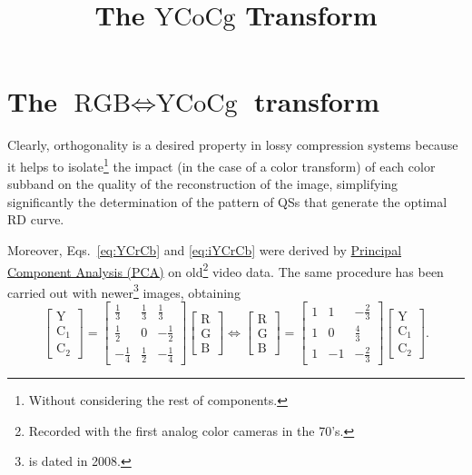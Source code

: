 
\title{The $\text{YCoCg}$ Transform}
\maketitle

\tableofcontents

\section{The $\text{RGB} \Leftrightarrow \text{YCoCg}$ transform}

Clearly, orthogonality is a desired property in lossy compression
systems because it helps to isolate\footnote{Without considering the
rest of components.} the impact (in the case of a color transform) of
each color subband on the quality of the reconstruction of the image,
simplifying significantly the determination of the pattern of QSs that
generate the optimal RD curve.

Moreover, Eqs.~\ref{eq:YCrCb} and \ref{eq:iYCrCb} were derived by
\href{https://en.wikipedia.org/wiki/Principal_component_analysis}{Principal
  Component Analysis (PCA)} on old\footnote{Recorded with the first
analog color cameras in the 70's.} video data. The same procedure has
been carried out with newer\footnote{\cite{malvar2008lifting} is dated
in 2008.} images, obtaining
\begin{equation}
  \begin{bmatrix}
    \text{Y} \\
    \text{C}_1 \\
    \text{C}_2
  \end{bmatrix}
  =
  \begin{bmatrix}
    \frac{1}{3} & \frac{1}{3} &  \frac{1}{3} \\ 
    \frac{1}{2} &           0 & -\frac{1}{2} \\
   -\frac{1}{4} & \frac{1}{2} & -\frac{1}{4}
  \end{bmatrix}
  \begin{bmatrix}
    \text{R} \\
    \text{G} \\
    \text{B}
  \end{bmatrix}
  \Leftrightarrow
  \begin{bmatrix}
    \text{R} \\
    \text{G} \\
    \text{B}
  \end{bmatrix}
  =
  \begin{bmatrix}
    1  &  1  & -\frac{2}{3} \\ 
    1  &  0  &  \frac{4}{3} \\ 
    1  & -1  & -\frac{2}{3}
  \end{bmatrix}
  \begin{bmatrix}
    \text{Y} \\
    \text{C}_1 \\
    \text{C}_2
  \end{bmatrix}.
  \label{eq:optimal}
\end{equation}

